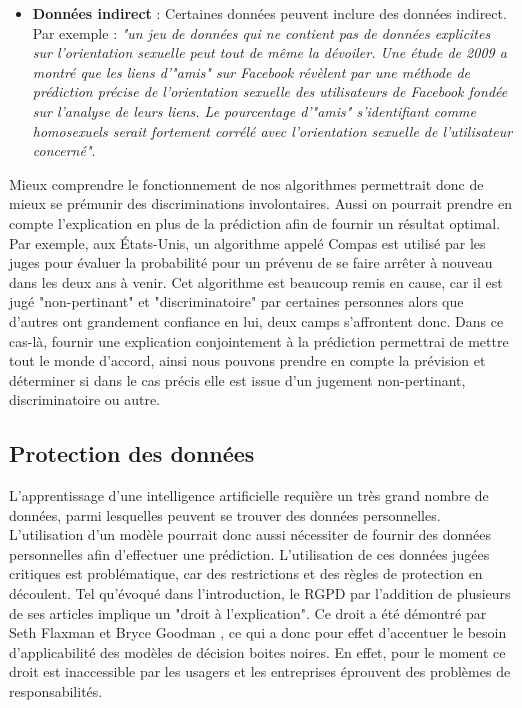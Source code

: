 \begin{itemize}
    \item \textbf{Données indirect} : Certaines données peuvent inclure des données indirect. Par exemple : \textit{"un jeu de données qui ne contient pas de données explicites sur l’orientation sexuelle peut tout de même la dévoiler. Une étude de 2009 a montré que les liens d’"amis" sur Facebook révèlent par une méthode de prédiction précise de l’orientation sexuelle des utilisateurs de Facebook fondée sur l’analyse de leurs liens. Le pourcentage d’"amis" s’identifiant comme homosexuels serait fortement corrélé avec l’orientation sexuelle de l’utilisateur concerné"}\cite{dicriminationAlgo}.
\end{itemize}
Mieux comprendre le fonctionnement de nos algorithmes permettrait donc de mieux se prémunir des discriminations involontaires. Aussi on pourrait prendre en compte l'explication en plus de la prédiction afin de fournir un résultat optimal. Par exemple, aux États-Unis, un algorithme appelé Compas est utilisé par les juges pour évaluer la probabilité pour un prévenu de se faire arrêter à nouveau dans les deux ans à venir. Cet algorithme est beaucoup remis en cause, car il est jugé "non-pertinant" et "discriminatoire" par certaines personnes alors que d'autres ont grandement confiance en lui, deux camps s'affrontent donc. Dans ce cas-là, fournir une explication conjointement à la prédiction permettrai de mettre tout le monde d'accord, ainsi nous pouvons prendre en compte la prévision et déterminer si dans le cas précis elle est issue d'un jugement non-pertinant, discriminatoire ou autre.
\subsection{Protection des données}
L'apprentissage d'une intelligence artificielle requière un très grand nombre de données, parmi lesquelles peuvent se trouver des données personnelles. L'utilisation d'un modèle pourrait donc aussi nécessiter de fournir des données personnelles afin d'effectuer une prédiction. L'utilisation de ces données jugées critiques est problématique, car des restrictions et des règles de protection en découlent. Tel qu'évoqué dans l'introduction, le RGPD par l'addition de plusieurs de ses articles implique un "droit à l'explication". Ce droit a été démontré par Seth Flaxman et Bryce Goodman \cite{RGPDexplanRight}, ce qui a donc pour effet d'accentuer le besoin d'applicabilité des modèles de décision boites noires. En effet, pour le moment ce droit est inaccessible par les usagers et les entreprises éprouvent des problèmes de responsabilités.

